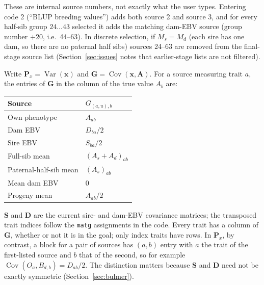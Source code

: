 \documentclass[11pt]{article}
\newcommand{\src}[1]{\texttt{#1}}
\newcommand{\Cov}{\operatorname{Cov}}
\newcommand{\Var}{\operatorname{Var}}
\newcommand{\ve}[1]{\boldsymbol{#1}}
\newcommand{\ma}[1]{\mathbf{#1}}
\begin{document}
\begin{codenote}
These are internal source numbers, not exactly what the user types. Entering code 2 (``BLUP breeding values'') adds both source 2 and source 3, and for every half-sib group $24\ldots43$ selected it adds the matching dam-EBV source (group number $+20$, i.e.\ 44--63). In discrete selection, if $M_s=M_d$ (each sire has one dam, so there are no paternal half sibs) sources 24--63 are removed from the final-stage source list (Section~\ref{sec:issues} notes that earlier-stage lists are not filtered).
\end{codenote}

Write $\ma P_x=\Var(\ve x)$ and $\ma G=\Cov(\ve x,\ve A)$. For a source measuring trait $a$, the entries of $\ma G$ in the column of the true value $A_b$ are:
\begin{center}
\begin{tabular}{ll}
\toprule Source & $G_{(a,u),b}$\\\midrule
Own phenotype & $A_{ab}$\\
Dam EBV & $D_{ba}/2$\\
Sire EBV & $S_{ba}/2$\\
Full-sib mean & $(A_s+A_d)_{ab}$\\
Paternal-half-sib mean & $(A_s)_{ab}$\\
Mean dam EBV & $0$\\
Progeny mean & $A_{ab}/2$\\\bottomrule
\end{tabular}
\end{center}
$\ma S$ and $\ma D$ are the current sire- and dam-EBV covariance matrices; the transposed trait indices follow the \src{matg} assignments in the code. Every trait has a column of $\ma G$, whether or not it is in the goal; only index traits have rows. In $\ma P_x$, by contrast, a block for a pair of sources has $(a,b)$ entry with $a$ the trait of the first-listed source and $b$ that of the second, so for example $\Cov(O_a,B_{d,b})=D_{ab}/2$. The distinction matters because $\ma S$ and $\ma D$ need not be exactly symmetric (Section~\ref{sec:bulmer}).
\end{document}
